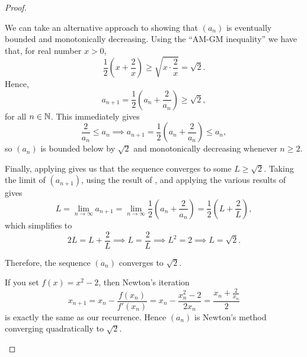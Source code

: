 \begin{problem}
\begin{proof}
    \begin{callout}
      We can take an alternative approach to showing that $(a_{n})$ is eventually bounded and monotonically decreasing.
      Using the ``AM-GM inequality''\footnotemark{} we have that, for real number $x > 0$,
        \[
          \frac{1}{2}\left( x + \frac{2}{x} \right) \geq \sqrt{x \cdot \frac{2}{x}} = \sqrt{2}.
        \]
      Hence,
      \[
        a_{n+1} = \frac{1}{2} \left( a_n + \frac{2}{a_n} \right) \geq \sqrt{2},
      \]
      for all $n \in \mathbb{N}$.
      This immediately gives
      \[
        \frac{2}{a_{n}} \leq a_n \implies a_{n+1} = \frac{1}{2} \left( a_n + \frac{2}{a_n} \right) \leq a_n,
      \]
      so $(a_{n})$ is bounded below by $\sqrt{2}$ and monotonically decreasing whenever $n \geq 2$.
    \end{callout}

    Finally, applying  gives us that the
    sequence converges to some $L \geq \sqrt{2}$. Taking the limit of $(a_{n+1})$,
    using the result of ,
    and applying the various results of
     gives
    \[
      L = \lim_{n \to \infty} a_{n+1} = \lim_{n \to \infty} \frac{1}{2} \left( a_n + \frac{2}{a_n} \right)
      = \frac{1}{2} \left( L + \frac{2}{L} \right),
    \]
    which simplifies to
    \[
      2L = L + \frac{2}{L} \implies L = \frac{2}{L} \implies L^2 = 2 \implies L = \sqrt{2}.
    \]

    Therefore, the sequence $(a_n)$ converges to $\sqrt{2}$.

    \begin{callout}
      If you set \(f(x)=x^2-2\), then Newton’s iteration
      \[
        x_{n+1}
        = x_n - \frac{f(x_n)}{f'(x_n)}
        = x_n - \frac{x_n^2 - 2}{2x_n}
        = \frac{x_n + \tfrac{2}{x_n}}{2}
      \]
      is exactly the same as our recurrence.  Hence $(a_n)$ is Newton’s method converging quadratically to $\sqrt2$.
    \end{callout}

  \end{proof}
\end{problem}

